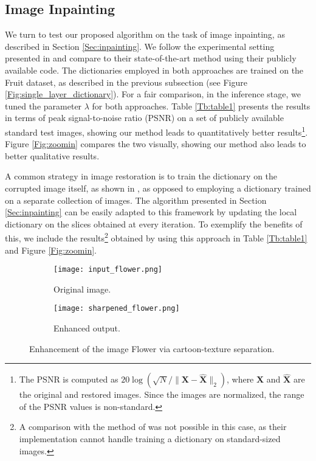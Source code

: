 \documentclass[10pt,twocolumn,letterpaper]{article}
\def\X{{\mathbf X}}
\begin{document}
\subsection{Image Inpainting}
We turn to test our proposed algorithm on the task of image inpainting, as described in Section \ref{Sec:inpainting}. We follow the experimental setting presented in \cite{Heide2015} and compare to their state-of-the-art method using their publicly available code. The dictionaries employed in both approaches are trained on the Fruit dataset, as described in the previous subsection (see Figure \ref{Fig:single_layer_dictionary}). For a fair comparison, in the inference stage, we tuned the parameter $\lambda$ for both approaches. Table \ref{Tb:table1} presents the results in terms of peak signal-to-noise ratio (PSNR) on a set of publicly available standard test images, showing our method leads to quantitatively better results\footnote{The PSNR is computed as $20\log ( \sqrt{N} / \| \X - \hat{\X} \|_2 )$, where $\X$ and $\hat{\X}$ are the original and restored images. Since the images are normalized, the range of the PSNR values is non-standard.}. Figure \ref{Fig:zoomin} compares the two visually, showing our method also leads to better qualitative results.

A common strategy in image restoration is to train the dictionary on the corrupted image itself, as shown in \cite{Elad2006}, as opposed to employing a dictionary trained on a separate collection of images. The algorithm presented in Section \ref{Sec:inpainting} can be easily adapted to this framework by updating the local dictionary on the slices obtained at every iteration. To exemplify the benefits of this, we include the results\footnote{A comparison with the method of \cite{Heide2015} was not possible in this case, as their implementation cannot handle training a dictionary on standard-sized images.} obtained by using this approach in Table \ref{Tb:table1} and Figure \ref{Fig:zoomin}.


\begin{figure}[t!]
	\centering
	\begin{subfigure}{0.2\textwidth}
		\centering
		\texttt{[image: input\_flower.png]}
		\caption{Original image.}
	\end{subfigure}
	\begin{subfigure}{0.2\textwidth}
		\centering
		\texttt{[image: sharpened\_flower.png]}
		\caption{Enhanced output.}
	\end{subfigure}
	\caption{Enhancement of the image \textsf{\small{Flower}} via cartoon-texture separation.}
	\label{Fig:enhancement}
	\vspace{-0.5cm}
\end{figure}
\end{document}
